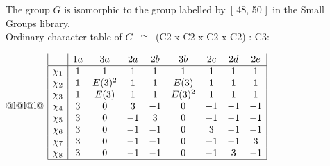 \documentclass[varwidth=\maxdimen,border=10]{standalone}
\begin{document}
The group $G$ is isomorphic to the group labelled by\ [ 48, 50 ]\ in the Small Groups library.\\
Ordinary character table of $G$\ $\cong$\ (C2 x C2 x C2 x C2) : C3:\\
\begin{center}
\begin{tabular}{@{}l@{}l@{}l@{}}
\hline
\(\begin{array}{|l|cccccccc|}
  & 1a & 3a & 2a & 2b & 3b & 2c & 2d & 2e\\ \hline
\chi_{1} & 1 & 1 & 1 & 1 & 1 & 1 & 1 & 1\\
\chi_{2} & 1 & E(3)^{2} & 1 & 1 & E(3) & 1 & 1 & 1\\
\chi_{3} & 1 & E(3) & 1 & 1 & E(3)^{2} & 1 & 1 & 1\\
\chi_{4} & 3 & 0 & 3 & -1 & 0 & -1 & -1 & -1\\
\chi_{5} & 3 & 0 & -1 & 3 & 0 & -1 & -1 & -1\\
\chi_{6} & 3 & 0 & -1 & -1 & 0 & 3 & -1 & -1\\
\chi_{7} & 3 & 0 & -1 & -1 & 0 & -1 & -1 & 3\\
\chi_{8} & 3 & 0 & -1 & -1 & 0 & -1 & 3 & -1\\
\hline
\end{array}\)\\
\end{tabular}
\end{center}
\end{document}

